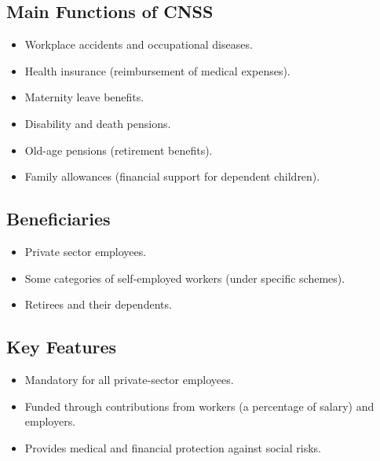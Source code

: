 \subsection{Main Functions of CNSS}
\begin{itemize}
    \item Workplace accidents and occupational diseases.
    \item Health insurance (reimbursement of medical expenses).
    \item Maternity leave benefits.
    \item Disability and death pensions.
    \item Old-age pensions (retirement benefits).
    \item Family allowances (financial support for dependent children).
\end{itemize}

\subsection{Beneficiaries}
\begin{itemize}
    \item Private sector employees.
    \item Some categories of self-employed workers (under specific schemes).
    \item Retirees and their dependents.
\end{itemize}

\subsection{Key Features}
\begin{itemize}
    \item Mandatory for all private-sector employees.
    \item Funded through contributions from workers (a percentage of salary) and employers.
    \item Provides medical and financial protection against social risks.
\end{itemize}
\clearpage
